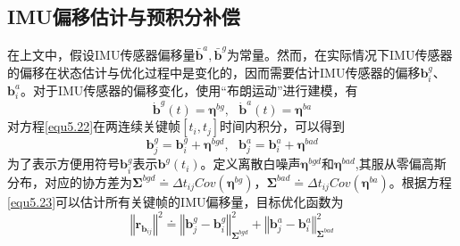\subsection{IMU偏移估计与预积分补偿}
在上文中，假设IMU传感器偏移量${\bar{\boldsymbol{b}}^a, \bar{\boldsymbol{b}}^g}$为常量。然而，在实际情况下IMU传感器的偏移在状态估计与优化过程中是变化的，因而需要估计IMU传感器的偏移$\boldsymbol{b}_i^g$、$\boldsymbol{b}_i^a$。对于IMU传感器的偏移变化，使用“布朗运动”进行建模，有
\begin{equation}
\label{equ5.22}
\dot{\boldsymbol{b}}^g(t) = \boldsymbol{\eta}^{bg}, \ \ \ \dot{\boldsymbol{b}}^a(t) = \boldsymbol{\eta}^{ba}
\end{equation}
对方程\eqref{equ5.22}在两连续关键帧$[t_i,t_j]$时间内积分，可以得到
\begin{equation}
\label{equ5.23}
\boldsymbol{b}_j^g = \boldsymbol{b}_i^g+\boldsymbol{\eta}^{bgd}, \ \ \ \boldsymbol{b}_j^a = \boldsymbol{b}_i^a+\boldsymbol{\eta}^{bad}
\end{equation}
为了表示方便用符号$\boldsymbol{b}_i^g$表示$\boldsymbol{b}^g(t_i)$。定义离散白噪声$\boldsymbol{\eta}^{bgd}$和$\boldsymbol{\eta}^{bad}$,其服从零偏高斯分布，对应的协方差为$\boldsymbol{\Sigma}^{bgd} \doteq \Delta t_{ij} Cov(\boldsymbol{\eta}^{bg}) $，$\boldsymbol{\Sigma}^{bad} \doteq \Delta t_{ij} Cov(\boldsymbol{\eta}^{ba})$。根据方程\eqref{equ5.23}可以估计所有关键帧的IMU偏移量，目标优化函数为
\begin{equation}
\label{equ5.24}
\left\Vert \boldsymbol{r}_{\boldsymbol{b}_{ij}} \right\Vert ^2 \doteq \left\Vert \boldsymbol{b}_j^g -\boldsymbol{b}_i^g \right\Vert_{\boldsymbol{\Sigma}^{bgd}}^2 + \left\Vert \boldsymbol{b}_j^a -\boldsymbol{b}_i^a \right\Vert_{\boldsymbol{\Sigma}^{bad}}^2
\end{equation}


